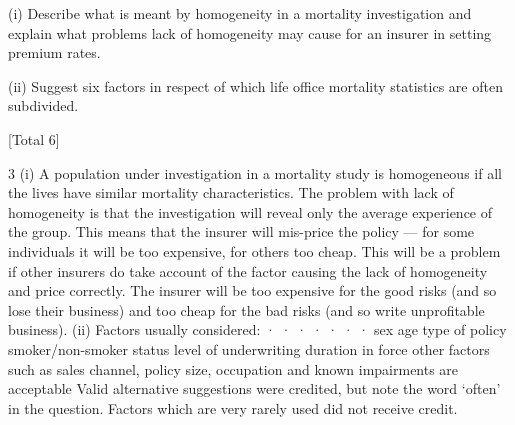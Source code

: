 \documentclass[a4paper,12pt]{article}
\begin{document}

(i) Describe what is meant by homogeneity in a mortality investigation and
explain what problems lack of homogeneity may cause for an insurer in setting
premium rates.

(ii) Suggest six factors in respect of which life office mortality statistics are often
subdivided.

[Total 6]




3
(i)
A population under investigation in a mortality study is homogeneous if all the
lives have similar mortality characteristics.
The problem with lack of homogeneity is that the investigation will reveal
only the average experience of the group.
This means that the insurer will mis-price the policy — for some individuals it
will be too expensive, for others too cheap.
This will be a problem if other insurers do take account of the factor causing
the lack of homogeneity and price correctly. The insurer will be too expensive
for the good risks (and so lose their business) and too cheap for the bad risks
(and so write unprofitable business).
(ii)
Factors usually considered:
·
·
·
·
·
·
·
sex
age
type of policy
smoker/non-smoker status
level of underwriting
duration in force
other factors such as sales channel, policy size, occupation and known
impairments are acceptable
Valid alternative suggestions were credited, but note the word ‘often’ in the
question. Factors which are very rarely used did not receive credit.
\end{document}
